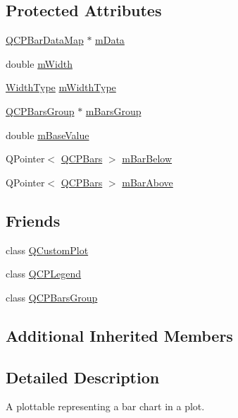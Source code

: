 \subsection*{Protected Attributes}
\begin{DoxyCompactItemize}
\item 
\hyperlink{qcustomplot_8h_aa846c77472cae93def9f1609d0c57191}{Q\+C\+P\+Bar\+Data\+Map} $\ast$ \hyperlink{classQCPBars_aef28d29d51ef84b608ecd22c55d531ff}{m\+Data}
\item 
double \hyperlink{classQCPBars_a7c4e0f2246f8133f48a9c3f24cf5b920}{m\+Width}
\item 
\hyperlink{classQCPBars_a65dbbf1ab41cbe993d71521096ed4649}{Width\+Type} \hyperlink{classQCPBars_a94dba1309496c7601d01e2c59715cbb3}{m\+Width\+Type}
\item 
\hyperlink{classQCPBarsGroup}{Q\+C\+P\+Bars\+Group} $\ast$ \hyperlink{classQCPBars_a9f59c255f3739182ca9744dff75beaa9}{m\+Bars\+Group}
\item 
double \hyperlink{classQCPBars_aa0515cf47fa6044cc28e59b1ae5ec759}{m\+Base\+Value}
\item 
Q\+Pointer$<$ \hyperlink{classQCPBars}{Q\+C\+P\+Bars} $>$ \hyperlink{classQCPBars_ad51db970eed7e286f2753b0216fc56de}{m\+Bar\+Below}
\item 
Q\+Pointer$<$ \hyperlink{classQCPBars}{Q\+C\+P\+Bars} $>$ \hyperlink{classQCPBars_a0c1c46076c41a478dbb373cfd35929aa}{m\+Bar\+Above}
\end{DoxyCompactItemize}
\subsection*{Friends}
\begin{DoxyCompactItemize}
\item 
class \hyperlink{classQCPBars_a1cdf9df76adcfae45261690aa0ca2198}{Q\+Custom\+Plot}
\item 
class \hyperlink{classQCPBars_a8429035e7adfbd7f05805a6530ad5e3b}{Q\+C\+P\+Legend}
\item 
class \hyperlink{classQCPBars_ae1051b4d58a2786cb420367a586e2fee}{Q\+C\+P\+Bars\+Group}
\end{DoxyCompactItemize}
\subsection*{Additional Inherited Members}


\subsection{Detailed Description}
A plottable representing a bar chart in a plot. 



